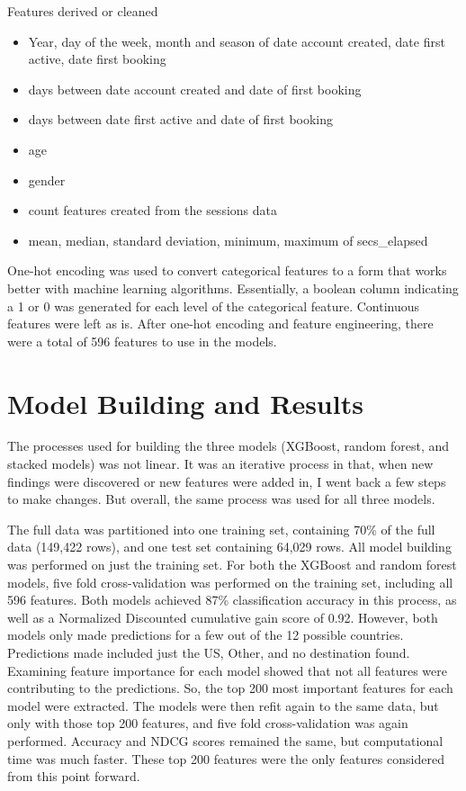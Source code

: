 \documentclass{article}
\begin{document}
Features derived or cleaned 
\begin{itemize}
  \item Year, day of the week, month and season of date account created, date first active, date first booking 
  \item days between date account created and date of first booking
  \item days between date first active and date of first booking 
  \item age
  \item gender
  \item count features created from the sessions data 
  \item mean, median, standard deviation, minimum, maximum of secs\_elapsed
\end{itemize}

One-hot encoding was used to convert categorical features to a form that works better with machine learning 
algorithms. Essentially, a boolean column indicating a 1 or 0 was generated for each level of the categorical feature.
Continuous features were left as is. After one-hot encoding and feature engineering, there were a total of 596
features to use in the models. 

\section{Model Building and Results}

The processes used for building the three models (XGBoost, random forest, and stacked models) was not linear.
It was an iterative process in that, when new findings were discovered or new features were added in, I went back 
a few steps to make changes. But overall, the same process was used for all three models. 

The full data was partitioned into one training set, containing 70\% of the full data (149,422 rows), and one 
test set containing 64,029 rows. All model building was performed on just the training set. For both the XGBoost 
and random forest models, five fold cross-validation was performed on the training set, including all 596 features. 
Both models achieved 87\% classification accuracy in this process, as well as a Normalized Discounted cumulative
gain score of 0.92. However, both models only made predictions for a few out of the 12 possible countries. Predictions
made included just the US, Other, and no destination found. Examining feature importance for each model showed that not 
all features were contributing to the predictions. So, the top 200 most important features for each model were extracted. 
The models were then refit again to the same data, but only with those top 200 features, and five fold cross-validation 
was again performed. Accuracy and NDCG scores remained the same, but computational time was much faster. These 
top 200 features were the only features considered from this point forward. 
\end{document}
